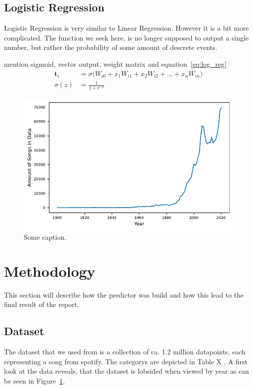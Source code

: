 \documentclass{article}
\begin{document}
\subsection{Logistic Regression}
Logistic Regression is very similar to Linear Regression. However it is a bit more complicated. The function we seek here, is no longer supposed to output a single number, but rather the probability of some amount of descrete events.

\answerTODO mention sigmoid, vector output, weight matrix and equation~\ref{eq:log_reg}
\begin{align}
  \mathbf{t}_i &= \sigma\Big(W_{i0} + x_1W_{i1}+ x_2W_{i2}+ \dots + x_nW_{in}\Big) \label{eq:log_reg} \\
  \sigma(z) &= \frac{1}{1+e^{-z}}
\end{align}


\begin{figure}[t]
  \label{fig:data_spread}
  \centering
  \includegraphics{data_spread}
  \caption{Some caption.}
\end{figure}

\section{Methodology}
This section will describe how the predictor was build and how this lead to the final result of the report.

\subsection{Dataset}
The dataset that we used from \citet{dataset} is a collection of ca. 1.2 million datapoints, each representing a song from spotify. The categorys are depicted in Table X \answerTODO{}. A first look at the data reveals, that the dataset is lobsided when viewed by year as can be seen in Figure~\ref{fig:data_spread}.
\end{document}
